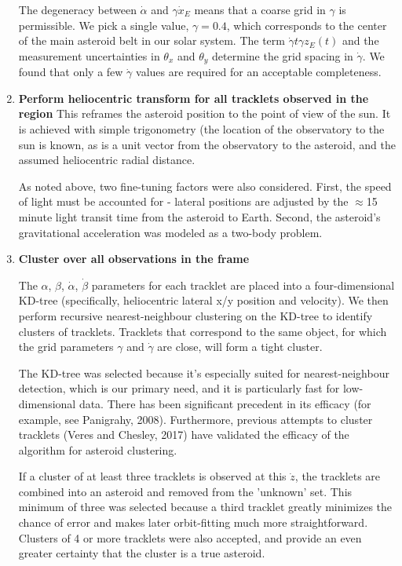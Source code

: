 \documentclass[11pt,letter]{article}
\begin{document}
\begin{enumerate}
The degeneracy between $\dot\alpha$ and $\gamma\dot{x}_E$ means that a coarse grid in $\gamma$ is permissible.  We pick a single value, $\gamma=0.4$, which corresponds to the center of the main asteroid belt in our solar system.  The term $\dot\gamma t\gamma z_E(t)$ and the measurement uncertainties in $\theta_x$ and $\theta_y$ determine the grid spacing in $\dot\gamma$.  We found that only a few $\dot\gamma$ values are required for an acceptable completeness.


    \item \textbf{Perform heliocentric transform for all tracklets observed in the region}\newline
    This reframes the asteroid position to the point of view of the sun.  It is achieved with simple trigonometry (the location of the observatory to the sun is known, as is a unit vector from the observatory to the asteroid, and the assumed heliocentric radial distance.
    
    As noted above, two fine-tuning factors were also considered.  First, the speed of light must be accounted for - lateral positions are adjusted by the $\approx$15 minute light transit time from the asteroid to Earth.  Second, the asteroid's gravitational acceleration was modeled as a two-body problem.
    \item \textbf{Cluster over all observations in the frame}
    
    The $\alpha$, $\beta$, $\dot\alpha$, $\dot\beta$ parameters for each tracklet are placed into a four-dimensional KD-tree (specifically, heliocentric lateral x/y position and velocity).  We then perform recursive nearest-neighbour clustering on the KD-tree to identify clusters of tracklets.  Tracklets that correspond to the same object, for which the grid parameters $\gamma$ and $\dot\gamma$ are close, will form a tight cluster.  
    
    The KD-tree was selected because it's especially suited for nearest-neighbour detection, which is our primary need, and it is particularly fast for low-dimensional data.  There has been significant precedent in its efficacy (for example, see Panigrahy, 2008). Furthermore, previous attempts to cluster tracklets (Veres and Chesley, 2017) have validated the efficacy of the algorithm for asteroid clustering.
    
    If a cluster of at least three tracklets is observed at this $\dot{z}$, the tracklets are combined into an asteroid and removed from the 'unknown' set.  This minimum of three was selected because a third tracklet greatly minimizes the chance of error and makes later orbit-fitting much more straightforward.  Clusters of 4 or more tracklets were also accepted, and provide an even greater certainty that the cluster is a true asteroid.
    

\end{enumerate}
\end{document}
